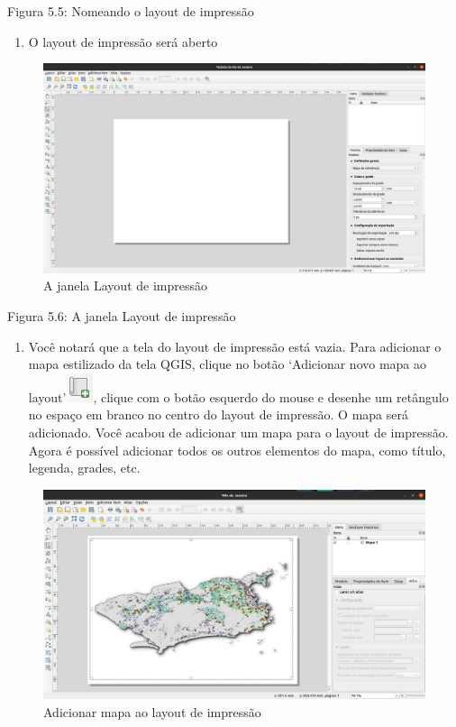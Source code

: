 \documentclass[
]{book}
\providecommand{\tightlist}{%
  \setlength{\itemsep}{0pt}\setlength{\parskip}{0pt}}
\begin{document}
Figura 5.5: Nomeando o layout de impressão

\begin{enumerate}
\def\labelenumi{\arabic{enumi}.}
\setcounter{enumi}{2}
\tightlist
\item
  O layout de impressão será aberto
\end{enumerate}

\begin{figure}
\centering
\includegraphics{media/modulo5/new-print-layout-window.png}
\caption{A janela Layout de impressão}
\end{figure}

Figura 5.6: A janela Layout de impressão

\begin{enumerate}
\def\labelenumi{\arabic{enumi}.}
\setcounter{enumi}{3}
\tightlist
\item
  Você notará que a tela do layout de impressão está vazia. Para adicionar o mapa estilizado da tela QGIS, clique no botão `Adicionar novo mapa ao layout'\includegraphics{media/modulo5/add_new_map_to_layout.png}, clique com o botão esquerdo do mouse e desenhe um retângulo no espaço em branco no centro do layout de impressão. O mapa será adicionado. Você acabou de adicionar um mapa para o layout de impressão. Agora é possível adicionar todos os outros elementos do mapa, como título, legenda, grades, etc.
\end{enumerate}

\begin{figure}
\centering
\includegraphics{media/modulo5/print-layout-map.png}
\caption{Adicionar mapa ao layout de impressão}
\end{figure}
\end{document}
